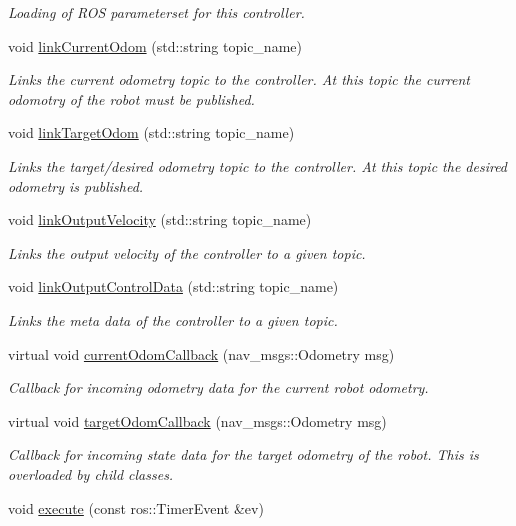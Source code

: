 \begin{DoxyCompactItemize}
\begin{DoxyCompactList}\small\item\em Loading of R\+OS parameterset for this controller. \end{DoxyCompactList}\item 
void \hyperlink{classController_aa0ea10adc7a81124663fb01693acef17}{link\+Current\+Odom} (std\+::string topic\+\_\+name)
\begin{DoxyCompactList}\small\item\em Links the current odometry topic to the controller. At this topic the current odomotry of the robot must be published. \end{DoxyCompactList}\item 
void \hyperlink{classController_a633d84f97952551654ee70acc31810c6}{link\+Target\+Odom} (std\+::string topic\+\_\+name)
\begin{DoxyCompactList}\small\item\em Links the target/desired odometry topic to the controller. At this topic the desired odometry is published. \end{DoxyCompactList}\item 
void \hyperlink{classController_a7bde6b39b2b2cccb1dd866841f672f99}{link\+Output\+Velocity} (std\+::string topic\+\_\+name)
\begin{DoxyCompactList}\small\item\em Links the output velocity of the controller to a given topic. \end{DoxyCompactList}\item 
void \hyperlink{classController_a6412541600d7444f00f8e48cea0ed024}{link\+Output\+Control\+Data} (std\+::string topic\+\_\+name)
\begin{DoxyCompactList}\small\item\em Links the meta data of the controller to a given topic. \end{DoxyCompactList}\item 
virtual void \hyperlink{classController_a9bf99e0d40660b832c2e70691e9f0a1c}{current\+Odom\+Callback} (nav\+\_\+msgs\+::\+Odometry msg)
\begin{DoxyCompactList}\small\item\em Callback for incoming odometry data for the current robot odometry. \end{DoxyCompactList}\item 
virtual void \hyperlink{classController_a77f138b6a3699c21cf904041e7e19820}{target\+Odom\+Callback} (nav\+\_\+msgs\+::\+Odometry msg)
\begin{DoxyCompactList}\small\item\em Callback for incoming state data for the target odometry of the robot. This is overloaded by child classes. \end{DoxyCompactList}\item 
void \hyperlink{classController_abe0a6e0155a0b159efe425e635d3ae76}{execute} (const ros\+::\+Timer\+Event \&ev)\hypertarget{classController_abe0a6e0155a0b159efe425e635d3ae76}{}\label{classController_abe0a6e0155a0b159efe425e635d3ae76}


\end{DoxyCompactItemize}
